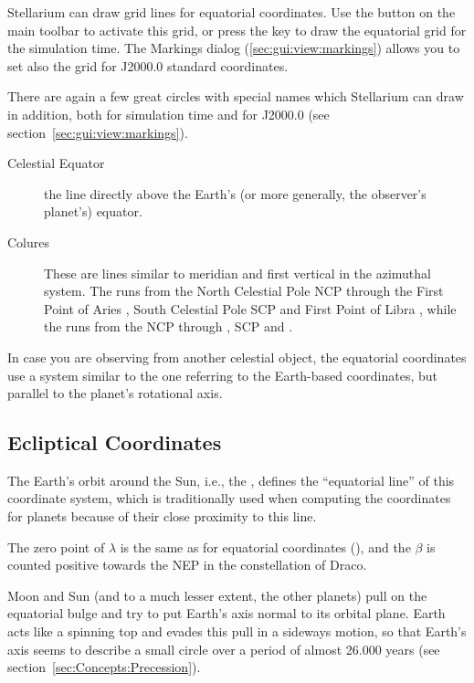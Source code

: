 Stellarium can draw grid lines for equatorial coordinates. Use the
button  on the main toolbar to activate
this grid, or press the  key to draw the equatorial grid for
the simulation time. The Markings dialog (\ref{sec:gui:view:markings})
allows you to set also the grid for J2000.0 standard coordinates.

There are again a few great circles with special names which
Stellarium can draw in addition, both for simulation time and for
J2000.0 (see section~\ref{sec:gui:view:markings}).
\begin{description}
\item[Celestial Equator] the line directly above the Earth's (or more
  generally, the observer's planet's) equator.
\item[Colures] These are lines similar to meridian and first vertical
  in the azimuthal system. The  runs from the
  North Celestial Pole NCP through the First Point of Aries \Aries,
  South Celestial Pole SCP and First Point of Libra \Libra, while the
   runs from the NCP through  \Cancer, SCP and  \Capricorn.
\end{description}

In case you are observing from another celestial object, the
equatorial coordinates use a system similar to the one referring to
the Earth-based coordinates, but parallel to the planet's rotational
axis.

\subsection{Ecliptical Coordinates}
\label{sec:Concepts:Ecliptical}

The Earth's orbit around the Sun, i.e., the ,
defines the ``equatorial line'' of this coordinate system, which is traditionally used when computing the coordinates for planets because of their close proximity to this line.

The zero point of  $\lambda$ is the
same as for equatorial coordinates (\Aries), and the  $\beta$ is counted positive towards the
 NEP in the constellation of
Draco.

Moon and Sun (and to a much lesser extent, the other planets) pull on
the equatorial bulge and try to put Earth's axis normal to its orbital
plane. Earth acts like a spinning top and evades this pull in a
sideways motion, so that Earth's axis seems to describe a small circle
over a period of almost 26.000 years (see section~\ref{sec:Concepts:Precession}). 

